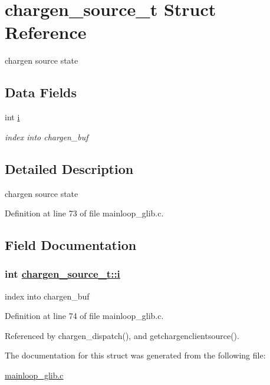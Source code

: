 \hypertarget{structchargen__source__t}{
\section{chargen\_\-source\_\-t Struct Reference}
\label{structchargen__source__t}
}
chargen source state  


\subsection*{Data Fields}
\begin{CompactItemize}
\item 
int \hyperlink{structchargen__source__t_o0}{i}
\begin{CompactList}\small\item\em index into chargen\_\-buf \item\end{CompactList}\end{CompactItemize}


\subsection{Detailed Description}
chargen source state 



Definition at line 73 of file mainloop\_\-glib.c.

\subsection{Field Documentation}
\hypertarget{structchargen__source__t_o0}{
\subsubsection[i]{\setlength{\rightskip}{0pt plus 5cm}int \hyperlink{structchargen__source__t_o0}{chargen\_\-source\_\-t::i}}}
\label{structchargen__source__t_o0}


index into chargen\_\-buf 



Definition at line 74 of file mainloop\_\-glib.c.

Referenced by chargen\_\-dispatch(), and getchargenclientsource().

The documentation for this struct was generated from the following file:\begin{CompactItemize}
\item 
\hyperlink{mainloop__glib_8c}{mainloop\_\-glib.c}\end{CompactItemize}
